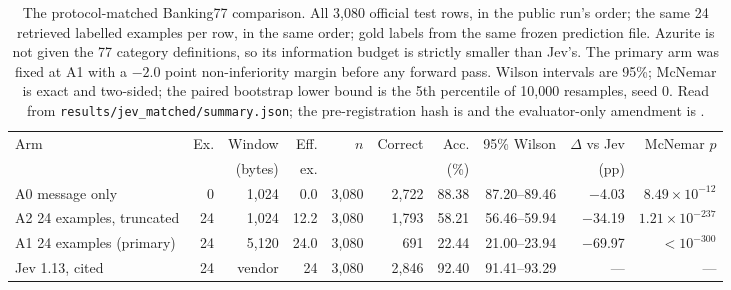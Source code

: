 \begin{table}[htbp]
\centering
\footnotesize
\caption{The protocol-matched Banking77 comparison. All 3{,}080 official test
rows, in the public run's order; the same 24 retrieved labelled examples per row,
in the same order; gold labels from the same frozen prediction file. Azurite is
not given the 77 category definitions, so its information budget is strictly
smaller than Jev's. The primary arm was fixed at A1 with a $-2.0$ point
non-inferiority margin before any forward pass. Wilson intervals are 95\%;
McNemar is exact and two-sided; the paired bootstrap lower bound is the 5th
percentile of 10{,}000 resamples, seed 0. Read from
\texttt{results/jev\_matched/summary.json}; the pre-registration hash is
\texttt{\JevMatchPreregSha} and the evaluator-only amendment is
\texttt{\JevMatchAmendmentSha}.}
\label{tab:jev-matched}
\setlength{\tabcolsep}{1.5pt}
\begin{tabular}{@{}lrrrrrrrrr@{}}
\toprule
Arm & Ex. & Window & Eff. & $n$ & Correct & Acc. & 95\% Wilson & $\Delta$ vs Jev & McNemar $p$ \\
 & & (bytes) & ex. & & & (\%) & & (pp) & \\
\midrule
A0 message only & 0 & 1{,}024 & 0.0 & 3{,}080 & 2{,}722 & 88.38 & 87.20--89.46 & $-$4.03 & $8.49\times10^{-12}$ \\
A2 24 examples, truncated & 24 & 1{,}024 & 12.2 & 3{,}080 & 1{,}793 & 58.21 & 56.46--59.94 & $-$34.19 & $1.21\times10^{-237}$ \\
A1 24 examples (primary) & 24 & 5{,}120 & 24.0 & 3{,}080 & 691 & 22.44 & 21.00--23.94 & $-$69.97 & $<10^{-300}$ \\
Jev 1.13, cited & 24 & vendor & 24 & 3{,}080 & 2{,}846 & 92.40 & 91.41--93.29 & --- & --- \\
\bottomrule
\end{tabular}
\end{table}
